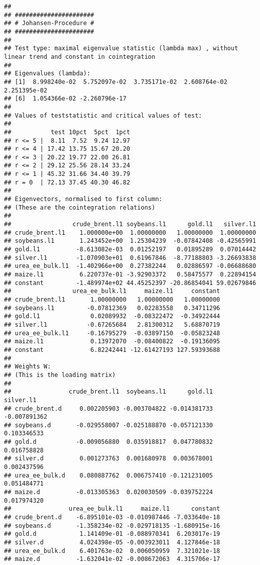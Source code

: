 \documentclass[
]{article}
\begin{document}
\begin{verbatim}
## 
## ###################### 
## # Johansen-Procedure # 
## ###################### 
## 
## Test type: maximal eigenvalue statistic (lambda max) , without linear trend and constant in cointegration 
## 
## Eigenvalues (lambda):
## [1]  8.998240e-02  5.752097e-02  3.735171e-02  2.608764e-02  2.251395e-02
## [6]  1.054366e-02 -2.260796e-17
## 
## Values of teststatistic and critical values of test:
## 
##           test 10pct  5pct  1pct
## r <= 5 |  8.11  7.52  9.24 12.97
## r <= 4 | 17.42 13.75 15.67 20.20
## r <= 3 | 20.22 19.77 22.00 26.81
## r <= 2 | 29.12 25.56 28.14 33.24
## r <= 1 | 45.32 31.66 34.40 39.79
## r = 0  | 72.13 37.45 40.30 46.82
## 
## Eigenvectors, normalised to first column:
## (These are the cointegration relations)
## 
##                 crude_brent.l1 soybeans.l1      gold.l1   silver.l1
## crude_brent.l1    1.000000e+00  1.00000000   1.00000000  1.00000000
## soybeans.l1       1.243452e+00  1.25304239  -0.07842408 -0.42565991
## gold.l1          -8.613082e-03  0.01252197   0.01895289  0.07014442
## silver.l1        -1.070903e+01  0.61967846  -8.77188803 -3.26693838
## urea_ee_bulk.l1  -1.402966e+00  0.27382244   0.02886597 -0.06688680
## maize.l1          6.220737e-01 -3.92903372   0.58475577  0.22894154
## constant         -1.489974e+02 44.45252397 -20.86854041 59.02679846
##                 urea_ee_bulk.l1     maize.l1     constant
## crude_brent.l1       1.00000000   1.00000000   1.00000000
## soybeans.l1         -0.07812369   0.02283558   0.34711296
## gold.l1              0.02089932  -0.08322472  -0.34922444
## silver.l1           -0.67265684   2.81300312   5.68870719
## urea_ee_bulk.l1     -0.16795279  -0.03897150  -0.05823248
## maize.l1             0.13972070  -0.08400822  -0.19136095
## constant             6.82242441 -12.61427193 127.59393688
## 
## Weights W:
## (This is the loading matrix)
## 
##                crude_brent.l1  soybeans.l1      gold.l1    silver.l1
## crude_brent.d     0.002205903 -0.003704822 -0.014381733 -0.007891362
## soybeans.d       -0.029558007 -0.025188870 -0.057121330  0.103346533
## gold.d           -0.009056880  0.035918817  0.047780832  0.016758828
## silver.d          0.001273763  0.001680978  0.003678001  0.002437596
## urea_ee_bulk.d    0.080887762  0.006757410 -0.121231005  0.051484771
## maize.d          -0.013305363  0.020030509 -0.039752224  0.017974320
##                urea_ee_bulk.l1     maize.l1      constant
## crude_brent.d    -6.895101e-03 -0.010987446 -7.033640e-18
## soybeans.d       -1.358234e-02 -0.029718135 -1.680915e-16
## gold.d            1.141409e-01 -0.088970341  6.203017e-19
## silver.d          4.024398e-05 -0.003923011  4.127846e-18
## urea_ee_bulk.d    6.401763e-02  0.006050959  7.321021e-18
## maize.d          -1.632041e-02 -0.008672063  4.315706e-17
\end{verbatim}
\end{document}
